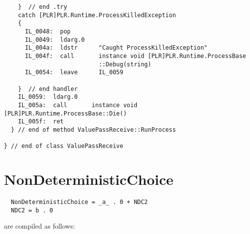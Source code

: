 \begin{lstlisting}
    }  // end .try
    catch [PLR]PLR.Runtime.ProcessKilledException 
    {
      IL_0048:  pop
      IL_0049:  ldarg.0
      IL_004a:  ldstr      "Caught ProcessKilledException"
      IL_004f:  call       instance void [PLR]PLR.Runtime.ProcessBase
                           ::Debug(string)
      IL_0054:  leave      IL_0059

    }  // end handler
    IL_0059:  ldarg.0
    IL_005a:  call       instance void [PLR]PLR.Runtime.ProcessBase::Die()
    IL_005f:  ret
  } // end of method ValuePassReceive::RunProcess

} // end of class ValuePassReceive

\end{lstlisting}

\section{NonDeterministicChoice}

	\begin{verbatim}
  NonDeterministicChoice = _a_ . 0 + NDC2
  NDC2 = b . 0
	\end{verbatim}
	
	are compiled as follows:

